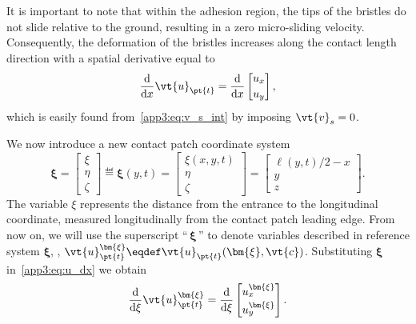 It is important to note that within the adhesion region, the tips of the bristles do not slide relative to the ground, resulting in a zero micro-sliding velocity. Consequently, the deformation of the bristles increases along the contact length direction with a spatial derivative equal to
%
\begin{equation}
  \dfrac{\mathrm{d}}{\mathrm{d}x}\vt{u}_{\pt{t}} =
  \dfrac{\mathrm{d}}{\mathrm{d}x}
  \begin{bmatrix}
    u_x \\[0.2em]
    u_y
  \end{bmatrix},
  \label{app3:eq:u_dx}
\end{equation}
%
which is easily found from~\eqref{app3:eq:v_s_int} by imposing $\vt{v}_s = 0$.

We now introduce a new contact patch coordinate system
%
\begin{equation}
  \bm{\xi} =
  \begin{bmatrix}
    \xi \\[0.2em]
    \eta \\[0.2em]
    \zeta
  \end{bmatrix}
  \eqdef \bm{\xi}(y,t) =
  \begin{bmatrix}
    \xi(x,y,t) \\[0.2em]
    \eta \\[0.2em]
    \zeta
  \end{bmatrix}
  =
  \begin{bmatrix}
    \ell(y,t)/2-x \\[0.2em]
    y \\[0.2em]
    z
  \end{bmatrix}.
\end{equation}
%
The variable $\xi$ represents the distance from the entrance to the longitudinal coordinate, measured longitudinally from the contact patch leading edge. From now on, we will use the superscript ``$\,\bm{\xi}\,$'' to denote variables described in reference system $\bm{\xi}$, \eg{}, $\vt{u}_{\pt{t}}^{\bm{\xi}} \eqdef \vt{u}_{\pt{t}}(\bm{\xi},\vt{c})$. Substituting $\bm{\xi}$ in~\eqref{app3:eq:u_dx} we obtain
%
\begin{equation}
  \dfrac{\mathrm{d}}{\mathrm{d}\xi}\vt{u}_{\pt{t}}^{\bm{\xi}} =
  \dfrac{\mathrm{d}}{\mathrm{d}\xi}
  \begin{bmatrix}
    u_{x}^{\bm{\xi}} \\[0.2em]
    u_{y}^{\bm{\xi}}
  \end{bmatrix}.
  \label{app3:eq:u_dxi}
\end{equation}
